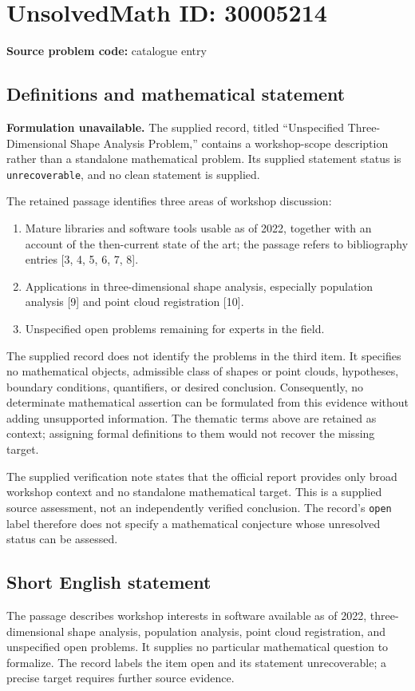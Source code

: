 \documentclass[11pt]{article}
\begin{document}
\section*{UnsolvedMath ID: 30005214}
\textbf{Source problem code:} catalogue entry
\subsection{Definitions and mathematical statement}
\textbf{Formulation unavailable.} The supplied record, titled ``Unspecified Three-Dimensional Shape Analysis Problem,'' contains a workshop-scope description rather than a standalone mathematical problem. Its supplied statement status is \texttt{unrecoverable}, and no clean statement is supplied.

The retained passage identifies three areas of workshop discussion:
\begin{enumerate}
\item Mature libraries and software tools usable as of 2022, together with an account of the then-current state of the art; the passage refers to bibliography entries [3, 4, 5, 6, 7, 8].
\item Applications in three-dimensional shape analysis, especially population analysis [9] and point cloud registration [10].
\item Unspecified open problems remaining for experts in the field.
\end{enumerate}
The supplied record does not identify the problems in the third item. It specifies no mathematical objects, admissible class of shapes or point clouds, hypotheses, boundary conditions, quantifiers, or desired conclusion. Consequently, no determinate mathematical assertion can be formulated from this evidence without adding unsupported information. The thematic terms above are retained as context; assigning formal definitions to them would not recover the missing target.

The supplied verification note states that the official report provides only broad workshop context and no standalone mathematical target. This is a supplied source assessment, not an independently verified conclusion. The record's \texttt{open} label therefore does not specify a mathematical conjecture whose unresolved status can be assessed.
\subsection{Short English statement}
The passage describes workshop interests in software available as of 2022, three-dimensional shape analysis, population analysis, point cloud registration, and unspecified open problems. It supplies no particular mathematical question to formalize. The record labels the item open and its statement unrecoverable; a precise target requires further source evidence.
\end{document}
